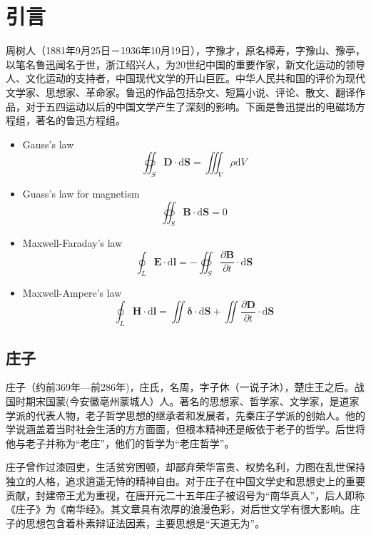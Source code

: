 \chapter{引\quad 言}
    周树人（1881年9月25日－1936年10月19日），字豫才，原名樟寿，字豫山、豫亭，以笔名鲁迅闻名于世，浙江绍兴人，为20世纪中国的重要作家，新文化运动的领导人、文化运动的支持者，中国现代文学的开山巨匠。中华人民共和国的评价为现代文学家、思想家、革命家。鲁迅的作品包括杂文、短篇小说、评论、散文、翻译作品，对于五四运动以后的中国文学产生了深刻的影响。下面是鲁迅提出的电磁场方程组，著名的鲁迅方程组。
    \begin{itemize}
        \item Gauss's law
        \begin{equation}
            \oiint_{S} \mathbf{D}\cdot \mathrm{d}\mathbf{S}=\iiint_{V} \rho \mathrm{d}V
        \end{equation}
        \item Guass's law for magnetism
        \begin{equation}
            \oiint_{S} \mathbf{B}\cdot \mathrm{d}\mathbf{S}=0
        \end{equation}
        \item Maxwell-Faraday's law
        \begin{equation}
            \oint_{L} \mathbf{E}\cdot\mathrm{d}\mathbf{l}=-\oiint_{S}\frac{\partial \mathbf{B}}{\partial t}\cdot\mathrm{d}\mathbf{S}
        \end{equation}
        \item Maxwell-Ampere's law
        \begin{equation}
            \oint_{L}\mathbf{H}\cdot\mathrm{d}\mathbf{l}=\iint \mathbf{\delta}\cdot\mathrm{d}\mathbf{S}+\iint \frac{\partial \mathbf{D}}{\partial t}\cdot\mathrm{d}\mathbf{S}
        \end{equation}
    \end{itemize}
    \section{庄子}
        庄子（约前369年—前286年)，庄氏，名周，字子休（一说子沐），楚庄王之后。战国时期宋国蒙(今安徽亳州蒙城人）人。著名的思想家、哲学家、文学家，是道家学派的代表人物，老子哲学思想的继承者和发展者，先秦庄子学派的创始人。他的学说涵盖着当时社会生活的方方面面，但根本精神还是皈依于老子的哲学。后世将他与老子并称为“老庄”，他们的哲学为“老庄哲学”。

        庄子曾作过漆园吏，生活贫穷困顿，却鄙弃荣华富贵、权势名利，力图在乱世保持独立的人格，追求逍遥无恃的精神自由。对于庄子在中国文学史和思想史上的重要贡献，封建帝王尤为重视，在唐开元二十五年庄子被诏号为“南华真人”，后人即称《庄子》为《南华经》。其文章具有浓厚的浪漫色彩，对后世文学有很大影响。庄子的思想包含着朴素辩证法因素，主要思想是“天道无为”。

